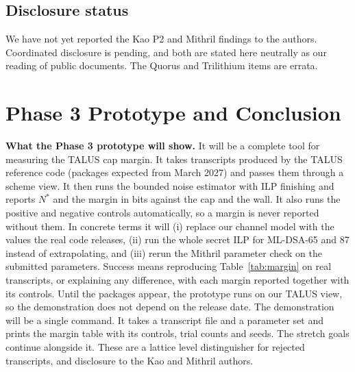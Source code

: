 \documentclass[10pt,conference,a4paper]{IEEEtran}
\begin{document}
\subsection{Disclosure status}
We have not yet reported the Kao P2 and Mithril findings to the authors. Coordinated disclosure is pending, and both are
stated here neutrally as our reading of public documents. The Quorus and Trilithium items are errata.

\section{Phase 3 Prototype and Conclusion}
\textbf{What the Phase 3 prototype will show.} It will be a complete tool for measuring the TALUS cap margin. It takes
transcripts produced by the TALUS reference code (packages expected from March 2027) and passes them through a scheme view.
It then runs the bounded noise estimator with ILP finishing and reports $N^*$ and the margin in bits against the cap and the
wall. It also runs the positive and negative controls automatically, so a margin is never reported without them. In
concrete terms it will (i) replace our channel model with the values the real code releases, (ii) run the whole secret ILP
for ML-DSA-65 and 87 instead of extrapolating, and (iii) rerun the Mithril parameter check on the submitted parameters.
Success means reproducing Table~\ref{tab:margin} on real transcripts, or explaining any difference, with each margin
reported together with its controls. Until the packages appear, the prototype runs on our TALUS view, so the demonstration
does not depend on the release date. The demonstration will be a single command. It takes a transcript file and a parameter
set and prints the margin table with its controls, trial counts and seeds. The stretch goals continue alongside it. These
are a lattice level distinguisher for rejected transcripts, and disclosure to the Kao and Mithril authors.
\end{document}
